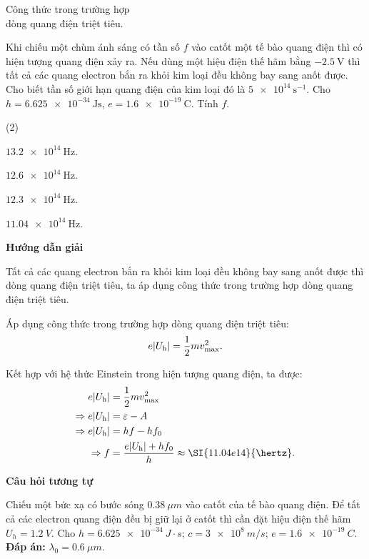 \begin{dang}{Công thức trong trường hợp\\ dòng quang điện triệt tiêu.}
	
	
	{Khi chiếu một chùm ánh sáng có tần số $f$ vào catốt một tế bào quang điện thì có hiện tượng quang điện xảy ra. Nếu dùng một hiệu điện thế hãm bằng $\SI{-2.5}{\volt}$ thì tất cả các quang electron bắn ra khỏi kim loại đều không bay sang anốt được. Cho biết tần số giới hạn quang điện của kim loại đó là $\SI{5e14}{\second ^ {-1}}$. Cho $h=\SI{6.625e-34}{\joule \second}$, $e=\SI{1.6e-19}{\coulomb}$. Tính $f$.
		\begin{mcq}(2)
			\item $\SI{13.2e14}{\hertz}$.
			\item $\SI{12.6e14}{\hertz}$.
			\item $\SI{12.3e14}{\hertz}$.
			\item $\SI{11.04e14}{\hertz}$.
		\end{mcq}
	}{\begin{center}
			\textbf{Hướng dẫn giải}
		\end{center}
		
		Tất cả các quang electron bắn ra khỏi kim loại đều không bay sang anốt được thì dòng quang điện triệt tiêu, ta áp dụng công thức trong trường hợp dòng quang điện triệt tiêu.
		
		Áp dụng công thức trong trường hợp dòng quang điện triệt tiêu:
		\begin{equation*}
			e |U_\text h|=\dfrac{1}{2}mv_\text{max}^2.
		\end{equation*}
		
		Kết hợp với hệ thức Einstein trong hiện tượng quang điện, ta được:
		\begin{align*}
			e |U_\text h|&=\dfrac{1}{2}mv_\text{max}^2 \\
			\Rightarrow e |U_\text h|&= \varepsilon - A \\
			\Rightarrow e |U_\text h|&=hf-hf_0 \\
			\Rightarrow f &= \dfrac{e |U_\text h| + hf_0}{h}\approx \SI{11.04e14}{\hertz}.
		\end{align*}
		
		\begin{center}
			\textbf{Câu hỏi tương tự}
		\end{center}
		
		Chiếu một bức xạ có bước sóng $ \SI{0,38}{\mu m} $ vào catốt của tế bào quang điện. Để tất cả các electron quang điện đều bị giữ lại ở catốt thì cần đặt hiệu điện thế hãm $ U_{h} = \SI{1,2}{V} $. Cho $ h = \SI{6,625 e-34}{J \cdot s} $; $ c = \SI{3 e8}{m/s} $; $ e = \SI{1,6 e-19}{C} $. \\
		
		\textbf{Đáp án:} $ \lambda_{0} = \SI{0,6}{\mu m} $.
	}
	
\end{dang}
